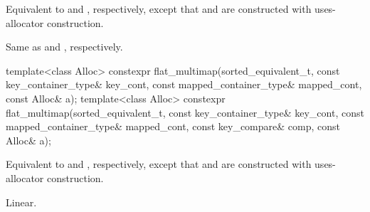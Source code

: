 \begin{itemdescr}
\pnum
\effects
Equivalent to  and
, respectively,
except that  and  are constructed
with uses-allocator construction.

\pnum
\complexity
Same as  and
, respectively.
\end{itemdescr}

%
\begin{itemdecl}
template<class Alloc>
  constexpr flat_multimap(sorted_equivalent_t, const key_container_type& key_cont,
                          const mapped_container_type& mapped_cont, const Alloc& a);
template<class Alloc>
  constexpr flat_multimap(sorted_equivalent_t, const key_container_type& key_cont,
                          const mapped_container_type& mapped_cont, const key_compare& comp,
                          const Alloc& a);
\end{itemdecl}

\begin{itemdescr}
\pnum
\effects
Equivalent to  and
, respectively,
except that  and  are constructed
with uses-allocator construction.

\pnum
\complexity
Linear.
\end{itemdescr}

